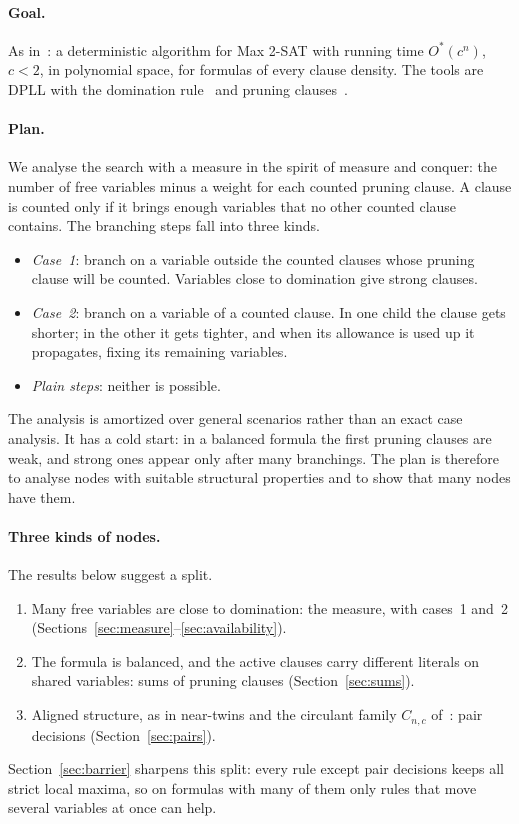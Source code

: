 \documentclass[11pt,a4paper]{article}
\theoremstyle{remark}
\newcommand{\Ostar}{O^{*}}
\begin{document}
\paragraph{Goal.} As in~\cite{N3}: a deterministic algorithm for Max 2-SAT
with running time $\Ostar(c^n)$, $c<2$, in polynomial space, for formulas of
every clause density. The tools are DPLL with the domination
rule~\cite{N1,N2} and pruning clauses~\cite{N3}.

\paragraph{Plan.} We analyse the search with a measure in the spirit of
measure and conquer: the number of free variables minus a weight for each
counted pruning clause. A clause is counted only if it brings enough variables
that no other counted clause contains. The branching steps fall into three
kinds.
\begin{itemize}
 \item \emph{Case~1}: branch on a variable outside the counted clauses whose
 pruning clause will be counted. Variables close to domination give strong
 clauses.
 \item \emph{Case~2}: branch on a variable of a counted clause. In one child the
 clause gets shorter; in the other it gets tighter, and when its allowance is
 used up it propagates, fixing its remaining variables.
 \item \emph{Plain steps}: neither is possible.
\end{itemize}
The analysis is amortized over general scenarios rather than an exact case
analysis. It has a cold start: in a balanced formula the first pruning clauses
are weak, and strong ones appear only after many branchings. The plan is
therefore to analyse nodes with suitable structural properties and to show
that many nodes have them.

\paragraph{Three kinds of nodes.} The results below suggest a split.
\begin{enumerate}
 \item Many free variables are close to domination: the measure, with
 cases~1 and~2 (Sections~\ref{sec:measure}--\ref{sec:availability}).
 \item The formula is balanced, and the active clauses carry different
 literals on shared variables: sums of pruning clauses
 (Section~\ref{sec:sums}).
 \item Aligned structure, as in near-twins and the circulant family
 $C_{n,c}$ of~\cite{N3}: pair decisions (Section~\ref{sec:pairs}).
\end{enumerate}
Section~\ref{sec:barrier} sharpens this split: every rule except pair
decisions keeps all strict local maxima, so on formulas with many of them only
rules that move several variables at once can help.
\end{document}
